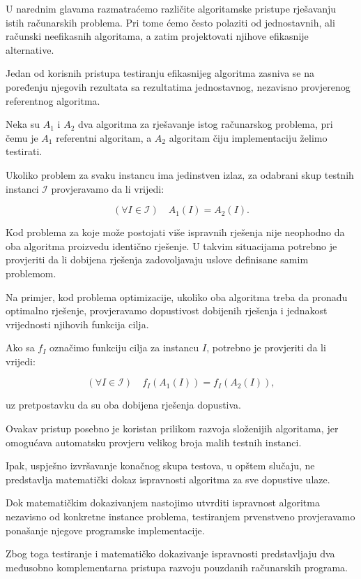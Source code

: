 U narednim glavama razmatraćemo različite algoritamske 
pristupe rješavanju istih računarskih problema. 
Pri tome ćemo često polaziti od jednostavnih, ali 
računski neefikasnih algoritama, a zatim projektovati 
njihove efikasnije alternative.

Jedan od korisnih pristupa testiranju efikasnijeg 
algoritma zasniva se na poređenju njegovih rezultata 
sa rezultatima jednostavnog, nezavisno provjerenog 
referentnog algoritma.

Neka su $A_1$ i $A_2$ dva algoritma za rješavanje 
istog računarskog problema, pri čemu je $A_1$ 
referentni algoritam, a $A_2$ algoritam čiju 
implementaciju želimo testirati.

Ukoliko problem za svaku instancu ima jedinstven 
izlaz, za odabrani skup testnih instanci 
$\mathcal{I}$ provjeravamo da li vrijedi:

\[
(\forall I\in\mathcal{I})\quad
A_1(I)=A_2(I).
\]

Kod problema za koje može postojati više ispravnih 
rješenja nije neophodno da oba algoritma proizvedu 
identično rješenje. U takvim situacijama potrebno 
je provjeriti da li dobijena rješenja zadovoljavaju 
uslove definisane samim problemom.

Na primjer, kod problema optimizacije, ukoliko oba 
algoritma treba da pronađu optimalno rješenje, 
provjeravamo dopustivost dobijenih rješenja i 
jednakost vrijednosti njihovih funkcija cilja.

Ako sa $f_I$ označimo funkciju cilja za instancu $I$, 
potrebno je provjeriti da li vrijedi:

\[
(\forall I\in\mathcal{I})\quad
f_I(A_1(I))=f_I(A_2(I)),
\]

uz pretpostavku da su oba dobijena rješenja dopustiva.

Ovakav pristup posebno je koristan prilikom razvoja 
složenijih algoritama, jer omogućava automatsku 
provjeru velikog broja malih testnih instanci.

Ipak, uspješno izvršavanje konačnog skupa testova, 
u opštem slučaju, ne predstavlja matematički dokaz 
ispravnosti algoritma za sve dopustive ulaze.

Dok matematičkim dokazivanjem nastojimo utvrditi 
ispravnost algoritma nezavisno od konkretne instance 
problema, testiranjem prvenstveno provjeravamo 
ponašanje njegove programske implementacije.

Zbog toga testiranje i matematičko dokazivanje 
ispravnosti predstavljaju dva međusobno 
komplementarna pristupa razvoju pouzdanih 
računarskih programa.

